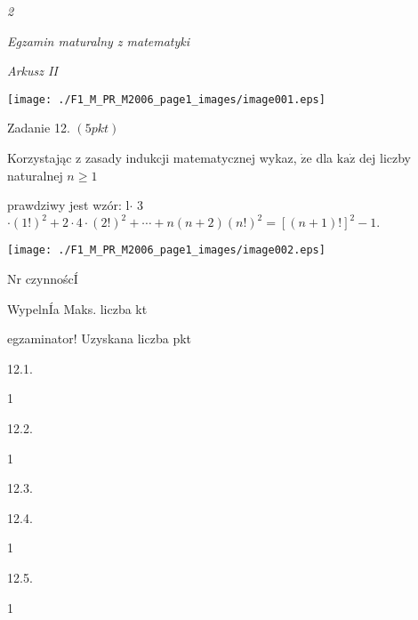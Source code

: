 \documentclass[a4paper,12pt]{article}
\begin{document}
{\it 2}

{\it Egzamin maturalny z matematyki}

{\it Arkusz II}
\begin{center}
\texttt{[image: ./F1\_M\_PR\_M2006\_page1\_images/image001.eps]}
\end{center}
Zadanie 12. $(5pkt)$

Korzystając z zasady indukcji matematycznej wykaz, $\dot{\mathrm{z}}\mathrm{e}$ dla $\mathrm{k}\mathrm{a}\dot{\mathrm{z}}$ dej liczby naturalnej $n\geq 1$

prawdziwy jest wzór: l$\cdot$ 3$\cdot(1!)^{2}+2\cdot 4\cdot(2!)^{2}+\cdots+n(n+2)(n!)^{2}=[(n+1)!]^{2}-1.$
\begin{center}
\texttt{[image: ./F1\_M\_PR\_M2006\_page1\_images/image002.eps]}
\end{center}
Nr czynnoścÍ

WypelnÍa Maks. liczba kt

egzaminator! Uzyskana liczba pkt

12.1.

1

12.2.

1

12.3.

12.4.

1

12.5.

1
\end{document}
